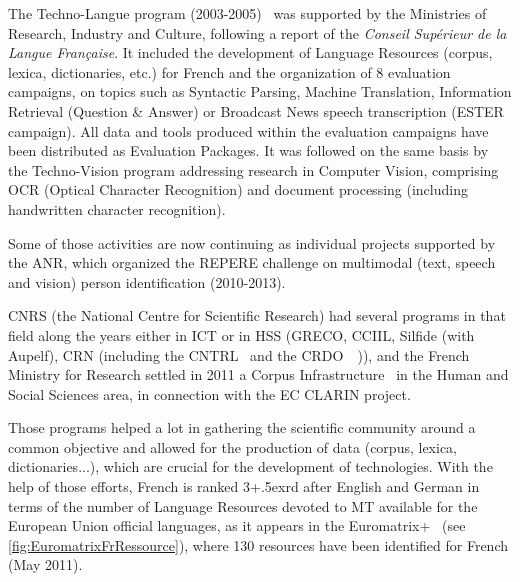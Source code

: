 \begin{multicols}{2}
The Techno-Langue program (2003-2005)~\cite{technolangue} was
supported by the Ministries of Research, Industry and Culture,
following a report of the {\em Conseil Supérieur de la Langue
  Française}. It included the development of Language Resources
(corpus, lexica, dictionaries, etc.) for French and the organization
of 8 evaluation campaigns, on topics such as Syntactic Parsing,
Machine Translation, Information Retrieval (Question \& Answer) or
Broadcast News speech transcription (ESTER campaign). All data and
tools produced within the evaluation campaigns have been distributed
as Evaluation Packages. It was followed on the same basis by the
Techno-Vision program addressing research in Computer Vision,
comprising OCR (Optical Character Recognition) and document processing
(including handwritten character recognition). 

Some of those activities are now
continuing as individual projects supported by the ANR, which
organized the REPERE challenge on multimodal (text, speech and vision)
person identification (2010-2013).

CNRS (the National Centre for Scientific Research) had several
programs in that field along the years either in ICT or in HSS (GRECO,
CCIIL, Silfide (with Aupelf), CRN (including the CNTRL~\cite{cnrtl} and the
CRDO~\cite{crdo}~\cite{crdo2})), and the French Ministry for Research settled in 2011 a
Corpus Infrastructure~\cite{infracorpus} in the Human and Social Sciences area, in
connection with the EC CLARIN project.

Those programs helped a lot in gathering the scientific community
around a common objective and allowed for the production of data
(corpus, lexica, dictionaries...), which are crucial for the development
of technologies. With the help of those efforts, French is ranked 3\raise+.5ex\hbox{rd}
after English and German in terms of the number of Language Resources
devoted to MT available for the European Union official languages, as
it appears in the Euromatrix+~\cite{euromatrixplus} (see \ref{fig:EuromatrixFrRessource}), where 130 resources have been identified for French (May 2011).



\end{multicols}
